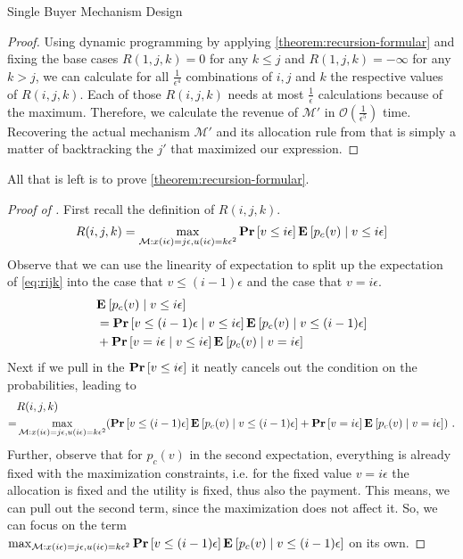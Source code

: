 \documentclass[11pt,a4paper]{article}
\renewcommand{\Pr}[1]{\mbox{\rm\bf Pr}\left[#1\right]}
\newcommand{\Ex}[2][]{\mbox{\rm\bf E}_{#1}\left[#2\right]}
\newcommand{\1}[1]{\mbox{\rm\bf 1}_{#1}}
\newcommand{\eqdot}{\text{ .}}
\begin{document}
\begin{section}{Single Buyer Mechanism Design}
\begin{proof}
     Using dynamic programming by applying \cref{theorem:recursion-formular} and fixing the base cases $R(1,j,k) = 0$ for any $k \leq j$ and $R(1,j,k)=-\infty$ for any $k > j$,
     we can calculate for all $\frac{1}{\epsilon^4}$ combinations of $i,j$ and $k$ the respective values of $R(i,j,k)$.
     Each of those $R(i,j,k)$ needs at most $\frac{1}{\epsilon}$ calculations because of the maximum.
     Therefore, we calculate the revenue of $\mathcal{M}'$ in $\mathcal{O}\left(\frac{1}{\epsilon^5}\right)$ time.
     Recovering the actual mechanism $\mathcal{M}'$ and its allocation rule from that is simply a matter of backtracking the $j'$ that maximized our expression.
 \end{proof}

 All that is left is to prove \cref{theorem:recursion-formular}.
 \begin{proof}[Proof of ]
     First recall the definition of $R(i,j,k)$.
     \begin{align*}
         R(i,j,k) = \max_{\mathcal{M}: x(i\epsilon) = j\epsilon, u(i\epsilon) = k \epsilon^2} \Pr{v \leq i\epsilon}\Ex{p_c(v)\mid v \leq i \epsilon}
     \end{align*}
     Observe that we can use the linearity of expectation to split up the expectation of \cref{eq:rijk} into the case that $v \leq (i-1)\epsilon$ and the case that $v = i \epsilon$.
     \begin{align*}
          & \Ex{p_c(v)\mid v \leq i \epsilon}                                                           \\
          & = \Pr{v \leq (i-1)\epsilon \mid v \leq i \epsilon} \Ex{p_c(v) \mid v \leq (i - 1) \epsilon} \\
          & + \Pr{v = i \epsilon \mid v \leq i \epsilon} \Ex{p_c(v) \mid v = i \epsilon}
     \end{align*}
     Next if we pull in the $\Pr{v \leq i\epsilon}$ it neatly cancels out the condition on the probabilities, leading to
     \begin{align*}
           & R(i,j,k)                                                                                                                                                                                             \\
         = & \max_{\mathcal{M}: x(i\epsilon) = j\epsilon, u(i\epsilon) = k \epsilon^2} (\Pr{v \leq (i-1)\epsilon} \Ex{p_c(v) \mid v \leq (i - 1) \epsilon} + \Pr{v = i \epsilon} \Ex{p_c(v) \mid v = i \epsilon}) \eqdot
     \end{align*}
     Further, observe that for $p_c(v)$ in the second expectation, everything is already fixed with the maximization constraints, i.e. for the fixed value $v = i \epsilon$ the allocation is fixed and the utility is fixed, thus also the payment.
     This means, we can pull out the second term, since the maximization does not affect it.
     So, we can focus on the term $\max_{\mathcal{M}: x(i\epsilon) = j\epsilon, u(i\epsilon)=k\epsilon^2} \Pr{v \leq (i-1)\epsilon} \Ex{p_c(v) \mid v \leq (i - 1) \epsilon}$ on its own.


\end{proof}
\end{section}
\end{document}
